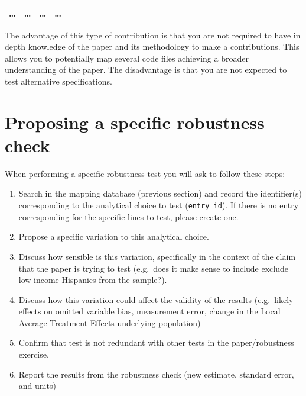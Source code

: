 \documentclass[]{book}
\begin{document}
\begin{longtable}[]{@{}lllllll@{}}
\begin{minipage}[t]{0.12\columnwidth}
\ldots{}\strut
\end{minipage} & \begin{minipage}[t]{0.19\columnwidth}\raggedright
\ldots{}\strut
\end{minipage} & \begin{minipage}[t]{0.18\columnwidth}\raggedright
\ldots{}\strut
\end{minipage} & \begin{minipage}[t]{0.12\columnwidth}\raggedright
\ldots{}\strut
\end{minipage}\tabularnewline
\bottomrule
\end{longtable}

The advantage of this type of contribution is that you are not required to have in depth knowledge of the paper and its methodology to make a contributions. This allows you to potentially map several code files achieving a broader understanding of the paper. The disadvantage is that you are not expected to test alternative specifications.

\hypertarget{proposing-a-specific-robustness-check}{%
\section{Proposing a specific robustness check}\label{proposing-a-specific-robustness-check}}

When performing a specific robustness test you will ask to follow these steps:

\begin{enumerate}
\def\labelenumi{\arabic{enumi}.}
\item
  Search in the mapping database (previous section) and record the identifier(s) corresponding to the analytical choice to test (\texttt{entry\_id}). If there is no entry corresponding for the specific lines to test, please create one.
\item
  Propose a specific variation to this analytical choice.
\item
  Discuss how sensible is this variation, specifically in the context of the claim that the paper is trying to test (e.g.~does it make sense to include exclude low income Hispanics from the sample?).
\item
  Discuss how this variation could affect the validity of the results (e.g.~likely effects on omitted variable bias, measurement error, change in the Local Average Treatment Effects underlying population)
\item
  Confirm that test is not redundant with other tests in the paper/robustness exercise.
\item
  Report the results from the robustness check (new estimate, standard error, and units)
\end{enumerate}
\end{document}
